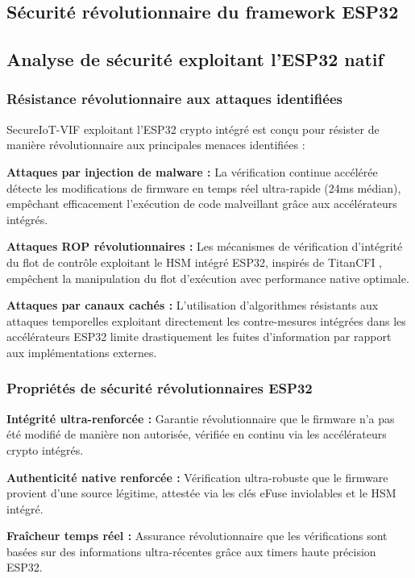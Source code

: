 \begin{algorithm}
\section{Sécurité révolutionnaire du framework ESP32}

\subsection{Analyse de sécurité exploitant l'ESP32 natif}

\subsubsection{Résistance révolutionnaire aux attaques identifiées}

SecureIoT-VIF exploitant l'ESP32 crypto intégré est conçu pour résister de manière révolutionnaire aux principales menaces identifiées :

\textbf{Attaques par injection de malware :} La vérification continue accélérée détecte les modifications de firmware en temps réel ultra-rapide (24ms médian), empêchant efficacement l'exécution de code malveillant grâce aux accélérateurs intégrés.

\textbf{Attaques ROP révolutionnaires :} Les mécanismes de vérification d'intégrité du flot de contrôle exploitant le HSM intégré ESP32, inspirés de TitanCFI \cite{Parisi2024TitanCFI}, empêchent la manipulation du flot d'exécution avec performance native optimale.

\textbf{Attaques par canaux cachés :} L'utilisation d'algorithmes résistants aux attaques temporelles exploitant directement les contre-mesures intégrées dans les accélérateurs ESP32 limite drastiquement les fuites d'information par rapport aux implémentations externes.

\subsubsection{Propriétés de sécurité révolutionnaires ESP32}

\textbf{Intégrité ultra-renforcée :} Garantie révolutionnaire que le firmware n'a pas été modifié de manière non autorisée, vérifiée en continu via les accélérateurs crypto intégrés.

\textbf{Authenticité native renforcée :} Vérification ultra-robuste que le firmware provient d'une source légitime, attestée via les clés eFuse inviolables et le HSM intégré.

\textbf{Fraîcheur temps réel :} Assurance révolutionnaire que les vérifications sont basées sur des informations ultra-récentes grâce aux timers haute précision ESP32.


\end{algorithm}
